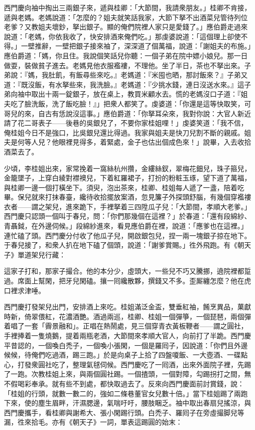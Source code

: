 西門慶向袖中掏出三兩銀子來，遞與桂卿：「大節間，我請衆朋友。」桂卿不肯接，遞與老媽。老媽說道：「怎麼的？姐夫就笑話我家，大節下拏不出酒菜兒管待列位老爹？又教姐夫壞鈔，拏出銀子。顯的俺們院裡人家只是愛錢了。」應伯爵走過來說道：「老媽，你依我收了，快安排酒來俺們吃。」那虔婆說道：「這個理上卻使不得。」一壁推辭，一壁把銀子接來袖了，深深道了個萬福，說道：「謝姐夫的布施。」{}應伯爵道：「媽，你且住。我說個笑話兒你聽：{}一個子弟在院中嫖小娘兒。那一日做耍，裝做貧子進去。老媽見他衣服襤褸，不理他。坐了半日，茶也不拏出來。子弟說：『媽，我肚飢，有飯尋些來吃。』老媽道：『米囤也晒，那討飯來？』子弟又道：『既沒飯，有水拏些來，我洗臉。』老媽道：『少挑水錢，連日沒送水來。』這子弟向袖中取出十兩一錠銀子，放在桌上，教買米顧水去。慌的老媽沒口子道：『姐夫吃了臉洗飯，洗了飯吃臉！』」把衆人都笑了。虔婆道：「你還是這等快取笑，可哥兒的來，自古有恁說沒這事。」{}應伯爵道：「你拏耳朵來，我對你說：大官人新近請了花二哥表子——{}後巷的吳銀兒了，不要你家桂姐哩！」虔婆笑道：「我不信，俺桂姐今日不是強口，比吳銀兒還比得過。我家與姐夫是快刀兒割不斷的親戚。{}姐夫是何等人兒？他眼裡見得多，着緊處，金子也估出個成色來！」說畢，入去收拾酒菜去了。

少頃，李桂姐出來，家常挽着一窩絲杭州攢，金縷絲釵，翠梅花鈿兒，珠子箍兒，金籠墜子，上穿白綾對襟襖兒，下着紅羅裙子，打扮的粉粧玉琢，望下道了萬福，與桂卿一邊一個打橫坐下。須臾，泡出茶來，桂卿、桂姐每人遞了一盞，陪着吃畢。保兒就來打抹春臺，纔待收拾擺放案酒，忽見簾子外探頭舒腦，有幾個穿襤褸衣者——謂之架兒，{}進來跪下，手裡拏着三四陞瓜子兒：「大節間，孝順大老爹。」西門慶只認頭一個叫于春兒，問：「你們那幾個在這裡？」於春道：「還有段綿紗、青聶鉞，在外邊伺候。」段綿紗進來，看見應伯爵在裡，說道：「應爹也在這裡。」連忙磕了頭。西門慶分付收了他瓜子兒，開啟銀包兒，捏一兩一塊銀子掠在地下。于春兒接了，和衆人扒在地下磕了個頭，說道：「謝爹賞賜。」徃外飛跑。有《朝天子》單道架兒行藏：

\begin{myquote}
這家子打和，那家子撮合。他的本分少，虛頭大，一些兒不巧又騰挪，遶院裡都踅過。席面上幫閑，把牙兒閑磕。攘一囘纔散夥，{}撰錢又不多。歪厮纏怎麼？他在虎口裡求津唾。
\end{myquote}

西門慶打發架兒出門，安排酒上來吃。桂姐滿泛金盃，雙垂紅袖，餚烹異品，菓獻時新，倚翠偎紅，花濃酒艷。酒過兩巡，桂卿、桂姐一個彈箏，一個琵琶，兩個彈着唱了一套「霽景融和」。正唱在熱鬧處，見三個穿青衣黃板鞭者——謂之圓社，手裡捧着一隻燒鵝，提着兩瓶老酒，大節間來孝順大官人，向前打了半跪。西門慶平昔認的，一個喚白禿子，一個喚小張閑，一個是羅囘子，{}因說道：「你們且外邊候候，待俺們吃過酒，踢三跑。」於是向桌子上拾了四盤嗄飯、一大壺酒、一碟點心，打發衆圓社吃了，整理氣毬伺候。西門慶吃了一囘酒，出來外面院子裡，先踢了一跑。次教桂姐上來，與兩個圓社踢。一個揸頭，一個對障，勾踢拐打之間，無不假喝彩奉承。就有些不到處，都快取過去了。反來向西門慶面前討賞錢，說：「桂姐的行頭，就數一數二的，強如二條巷董官女兒數十倍。」當下桂姐踢了兩跑下來，使的塵生眉畔，汗濕腮邊，氣喘吁吁，腰肢睏乏。袖中取出春扇兒搖涼，與西門慶攜手，看桂卿與謝希大、張小閑踢行頭。白禿子、羅囘子在旁虛撮脚兒等漏，徃來拾毛。亦有《朝天子》一詞，單表這踢圓的始末：

